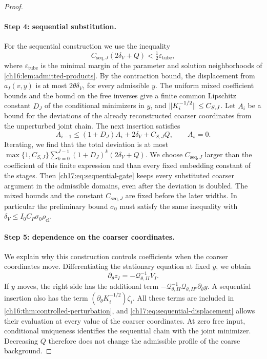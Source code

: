 \begin{proof}
\paragraph{Step 4: sequential substitution.}
For the sequential construction we use the inequality
\begin{equation}\label{ch17:eq:sequential-gate}
 C_{\mathrm{seq},J}(2\delta_V+Q)<\tfrac12\varepsilon_{\mathrm{tube}},
\end{equation}
where $\varepsilon_{\mathrm{tube}}$ is the minimal margin of the parameter and solution neighborhoods of \cref{ch16:lem:admitted-products}. By the contraction bound, the displacement from $a_I(v,y)$ is at most $2\theta\delta_V$, for every admissible $y$. The uniform mixed coefficient bounds and the bound on the free inverses give a finite common Lipschitz constant $D_J$ of the conditional minimizers in $y$, and $\lVert K_i^{-1/2}\rVert\le C_{S,J}$. Let $A_i$ be a bound for the deviations of the already reconstructed coarser coordinates from the unperturbed joint chain. The next insertion satisfies
\begin{equation}\label{ch17:eq:sequential-displacement}
 A_{i-1}\le(1+D_J)A_i+2\delta_V+C_{S,J}Q,\qquad A_s=0.
\end{equation}
Iterating, we find that the total deviation is at most $\max\{1,C_{S,J}\}\sum_{k=0}^{J-1}(1+D_J)^k(2\delta_V+Q)$. We choose $C_{\mathrm{seq},J}$ larger than the coefficient of this finite expression and than every fixed embedding constant of the stages. Then \eqref{ch17:eq:sequential-gate} keeps every substituted coarser argument in the admissible domains, even after the deviation is doubled. The mixed bounds and the constant $C_{\mathrm{seq},J}$ are fixed before the later widths. In particular the preliminary bound $\sigma_0$ must satisfy the same inequality with $\delta_V\le I_0C_P\sigma_0\rho_{\mathrm{cl}}$.

\paragraph{Step 5: dependence on the coarser coordinates.}
We explain why this construction controls coefficients when the coarser coordinates move. Differentiating the stationary equation at fixed $y$, we obtain
\begin{equation}\label{ch17:eq:prefix-response}
 \partial_\theta z_I=-\mathcal Q_{\theta,II}^{-1}V_I.
\end{equation}
If $y$ moves, the right side has the additional term $-\mathcal Q_{\theta,II}^{-1}\mathcal Q_{\theta,II^c}\partial_\theta y$. A sequential insertion also has the term $(\partial_\theta K_i^{-1/2})\zeta_i$. All these terms are included in \cref{ch16:thm:controlled-perturbation}, and \eqref{ch17:eq:sequential-displacement} allows their evaluation at every value of the coarser coordinates. At zero free input, conditional uniqueness identifies the sequential chain with the joint minimizer. Decreasing $Q$ therefore does not change the admissible profile of the coarse background.


\end{proof}
